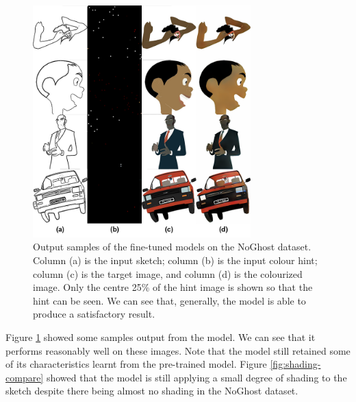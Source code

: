 \begin{figure}
    \centering
    \includegraphics[width=0.75\textwidth]{images/colorization/noghost-colorization.png}
    \caption[Output samples of the fine-tuned models on the NoGhost dataset.]{Output samples of the fine-tuned models on the NoGhost dataset. Column (a) is the input sketch; column (b) is the input colour hint; column (c) is the target image, and column (d) is the colourized image. Only the centre 25\% of the hint image is shown so that the hint can be seen. We can see that, generally, the model is able to produce a satisfactory result. }
    \label{fig:noghost_colorization}
\end{figure}

Figure \ref{fig:noghost_colorization} showed some samples output from the model. We can see that it performs reasonably well on these images. Note that the model still retained some of its characteristics learnt from the pre-trained model. Figure \ref{fig:shading-compare} showed that the model is still applying a small degree of shading to the sketch despite there being almost no shading in the NoGhost dataset.

